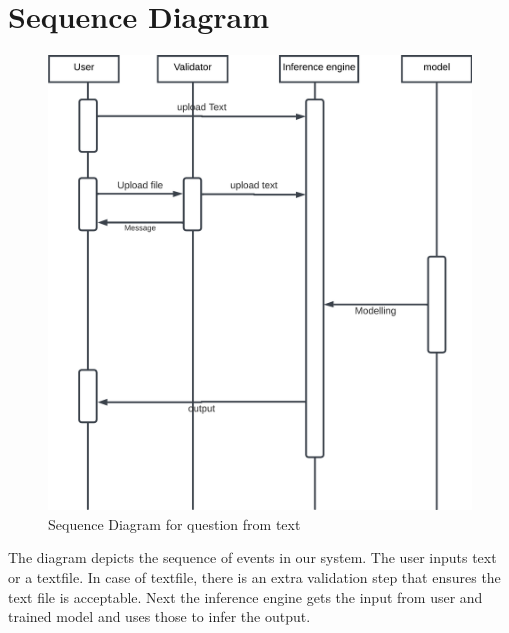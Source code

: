 \documentclass[12pt]{report}
\begin{document}
\section{Sequence Diagram}
\begin{figure}[ht!]
    \centering
    \includegraphics[scale = 1]{Images/SD.png}
    \caption{Sequence Diagram for question from text}
\end{figure}
The diagram depicts the sequence of events in our system. The user inputs text or a textfile. In case of textfile, there is an extra validation step that ensures the text file is acceptable. Next the inference engine gets the input from user and trained model and uses those to infer the output.
\pagebreak
\end{document}
